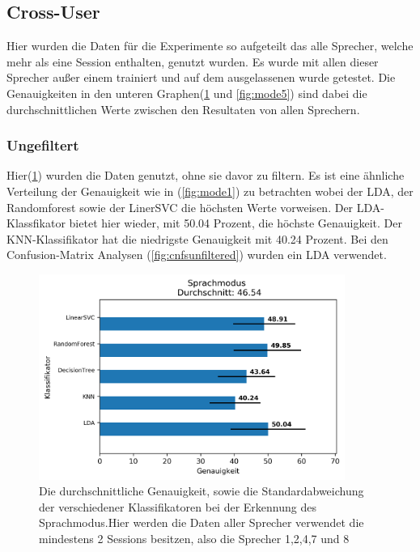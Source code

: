 \clearpage

\subsection{Cross-User}
Hier wurden die Daten für die Experimente so aufgeteilt das alle Sprecher, welche mehr als eine Session enthalten, genutzt wurden. Es wurde mit allen dieser Sprecher außer einem trainiert und auf dem ausgelassenen wurde getestet. Die Genauigkeiten in den unteren Graphen(\ref{fig:mode4} und \ref{fig:mode5}) sind dabei die durchschnittlichen Werte zwischen den Resultaten von allen Sprechern.

\subsubsection{Ungefiltert}
Hier(\ref{fig:mode4}) wurden die Daten genutzt, ohne sie davor zu filtern. Es ist eine ähnliche Verteilung der Genauigkeit wie in (\ref{fig:mode1}) zu betrachten wobei der LDA, der Randomforest sowie der LinerSVC die höchsten Werte vorweisen. Der LDA-Klassfikator bietet hier wieder, mit 50.04 Prozent, die höchste Genauigkeit. Der KNN-Klassifikator hat die niedrigste Genauigkeit mit 40.24 Prozent.
Bei den Confusion-Matrix Analysen (\ref{fig:cnfsunfiltered}) wurden ein LDA verwendet.

\begin{figure}[H]
  \centering
  \includegraphics[width=100mm ,scale=0.6]{modeResultsUserUnfiltered.png}
  \caption{Die durchschnittliche Genauigkeit, sowie die Standardabweichung der verschiedener Klassifikatoren bei der Erkennung des Sprachmodus.Hier werden die Daten aller Sprecher verwendet die mindestens 2 Sessions besitzen, also die Sprecher 1,2,4,7 und 8}
  \label{fig:mode4}
\end{figure}

\clearpage

